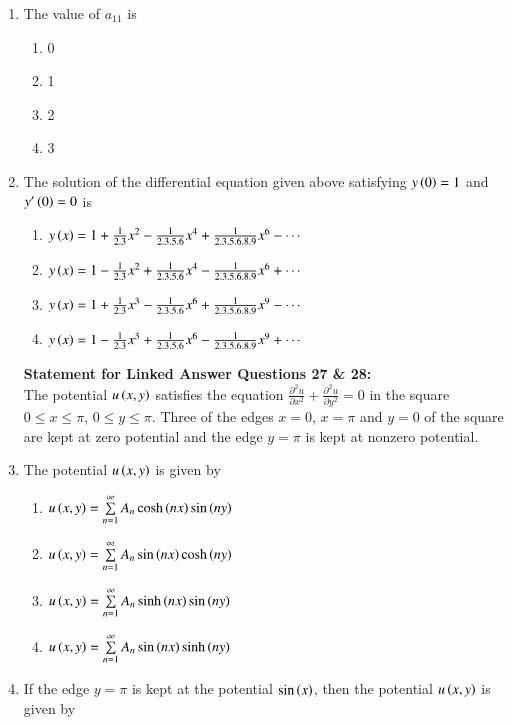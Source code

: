 \documentclass[journal]{IEEEtran}
\begin{document}
\begin{enumerate}
\item The value of $a_{11}$ is
 \begin{enumerate}
     \item 0
     \item 1
     \item 2
     \item 3 \\
 \end{enumerate}
\item The solution of the differential equation given above satisfying $y\left(0\right) = 1$ and $y'\left(0\right) = 0$ is
\begin{enumerate}
     \item $y\left(x\right) = 1 + \frac{1}{2.3}x^2 - \frac{1}{2.3.5.6}x^4 + \frac{1}{2.3.5.6.8.9}x^6 - \cdots$
     \item $y\left(x\right) = 1 - \frac{1}{2.3}x^2 + \frac{1}{2.3.5.6}x^4 - \frac{1}{2.3.5.6.8.9}x^6 + \cdots$
     \item $y\left(x\right) = 1 + \frac{1}{2.3}x^3 - \frac{1}{2.3.5.6}x^6 + \frac{1}{2.3.5.6.8.9}x^9 - \cdots$
     \item $y\left(x\right) = 1 - \frac{1}{2.3}x^3 + \frac{1}{2.3.5.6}x^6 - \frac{1}{2.3.5.6.8.9}x^9 + \cdots$ \\
 \end{enumerate}
\textbf{Statement for Linked Answer Questions 27 \& 28:} \\
The potential $u\left(x, y\right)$ satisfies the equation $\frac{\partial^2 u}{\partial x^2} + \frac{\partial^2 u}{\partial y^2} = 0$ in the square $0 \leq x \leq \pi$, $0 \leq y \leq \pi$. Three of the edges $x = 0$, $x = \pi$ and $y = 0$ of the square are kept at zero potential and the edge $y = \pi$ is kept at nonzero potential. \\
\item The potential $u\left(x, y\right)$ is given by
\begin{enumerate}
    \item $u\left(x, y\right) = \sum\limits_{n=1}^{\infty}A_n\cosh\left(nx\right)\sin\left(ny\right)$
    \item $u\left(x, y\right) = \sum\limits_{n=1}^{\infty}A_n\sin\left(nx\right)\cosh\left(ny\right)$
    \item $u\left(x, y\right) = \sum\limits_{n=1}^{\infty}A_n\sinh\left(nx\right)\sin\left(ny\right)$
    \item $u\left(x, y\right) = \sum\limits_{n=1}^{\infty}A_n\sin\left(nx\right)\sinh\left(ny\right)$ \\
\end{enumerate}
\item If the edge $y = \pi$ is kept at the potential $\sin\left(x\right)$, then the potential $u\left(x, y\right)$ is given by

\end{enumerate}
\end{document}

